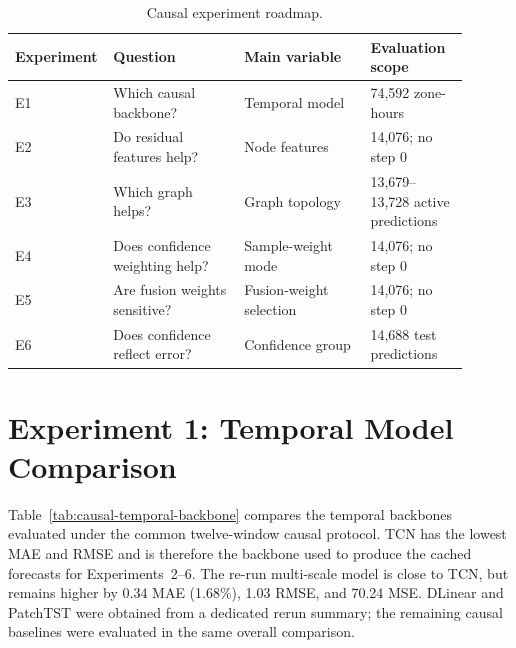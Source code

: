 \documentclass[12pt,a4paper]{report}
\begin{document}
	\begin{table}[H]
	    \centering
	    \caption{Causal experiment roadmap.}
	    \label{tab:causal-roadmap}
	    \small
	    \begin{tabular}{p{0.13\linewidth}p{0.29\linewidth}p{0.27\linewidth}p{0.21\linewidth}}
	        \toprule
	        Experiment & Question & Main variable & Evaluation scope \\
	        \midrule
	        E1 & Which causal backbone? & Temporal model & 74,592 zone-hours \\
	        E2 & Do residual features help? & Node features & 14,076; no step 0 \\
        E3 & Which graph helps? & Graph topology & 13,679--13,728 active predictions \\
        E4 & Does confidence weighting help? & Sample-weight mode & 14,076; no step 0 \\
        E5 & Are fusion weights sensitive? & Fusion-weight selection & 14,076; no step 0 \\
	        E6 & Does confidence reflect error? & Confidence group & 14,688 test predictions \\
	        \bottomrule
	    \end{tabular}
	\end{table}
	
	\section{Experiment 1: Temporal Model Comparison}
	\label{sec:temporal-model-comparison}
	
	Table~\ref{tab:causal-temporal-backbone} compares the temporal backbones evaluated under the common twelve-window causal protocol. TCN has the lowest MAE and RMSE and is therefore the backbone used to produce the cached forecasts for Experiments~2--6. The re-run multi-scale model is close to TCN, but remains higher by 0.34 MAE (1.68\%), 1.03 RMSE, and 70.24 MSE. DLinear and PatchTST were obtained from a dedicated rerun summary; the remaining causal baselines were evaluated in the same overall comparison.
	
\end{document}

